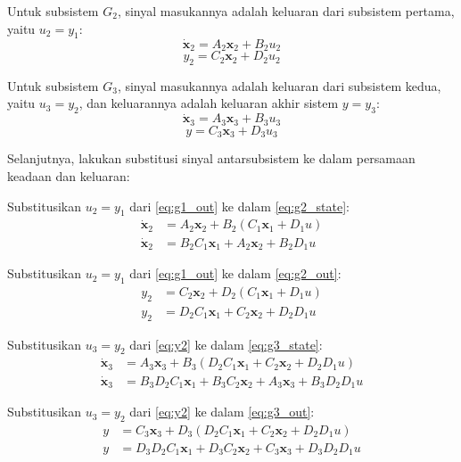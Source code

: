 \documentclass[11pt,a4paper]{article}
\begin{document}
Untuk subsistem $G_2$, sinyal masukannya adalah keluaran dari subsistem pertama, yaitu $u_2 = y_1$:
\begin{equation}
    \label{eq:g2_state}
    \mathbf{\dot{x}}_2 = A_2 \mathbf{x}_2 + B_2 u_2
\end{equation}
\begin{equation}
    \label{eq:g2_out}
    y_2 = C_2 \mathbf{x}_2 + D_2 u_2
\end{equation}

Untuk subsistem $G_3$, sinyal masukannya adalah keluaran dari subsistem kedua, yaitu $u_3 = y_2$, dan keluarannya adalah keluaran akhir sistem $y = y_3$:
\begin{equation}
    \label{eq:g3_state}
    \mathbf{\dot{x}}_3 = A_3 \mathbf{x}_3 + B_3 u_3
\end{equation}
\begin{equation}
    \label{eq:g3_out}
    y = C_3 \mathbf{x}_3 + D_3 u_3
\end{equation}

Selanjutnya, lakukan substitusi sinyal antarsubsistem ke dalam persamaan keadaan dan keluaran:

Substitusikan $u_2 = y_1$ dari \eqref{eq:g1_out} ke dalam \eqref{eq:g2_state}:
\begin{align}
    \label{eq:x2_dot}
    \mathbf{\dot{x}}_2 &= A_2 \mathbf{x}_2 + B_2 (C_1 \mathbf{x}_1 + D_1 u) \nonumber \\
    \mathbf{\dot{x}}_2 &= B_2 C_1 \mathbf{x}_1 + A_2 \mathbf{x}_2 + B_2 D_1 u
\end{align}

Substitusikan $u_2 = y_1$ dari \eqref{eq:g1_out} ke dalam \eqref{eq:g2_out}:
\begin{align}
    \label{eq:y2}
    y_2 &= C_2 \mathbf{x}_2 + D_2 (C_1 \mathbf{x}_1 + D_1 u) \nonumber \\
    y_2 &= D_2 C_1 \mathbf{x}_1 + C_2 \mathbf{x}_2 + D_2 D_1 u
\end{align}

Substitusikan $u_3 = y_2$ dari \eqref{eq:y2} ke dalam \eqref{eq:g3_state}:
\begin{align}
    \label{eq:x3_dot}
    \mathbf{\dot{x}}_3 &= A_3 \mathbf{x}_3 + B_3 (D_2 C_1 \mathbf{x}_1 + C_2 \mathbf{x}_2 + D_2 D_1 u) \nonumber \\
    \mathbf{\dot{x}}_3 &= B_3 D_2 C_1 \mathbf{x}_1 + B_3 C_2 \mathbf{x}_2 + A_3 \mathbf{x}_3 + B_3 D_2 D_1 u
\end{align}

Substitusikan $u_3 = y_2$ dari \eqref{eq:y2} ke dalam \eqref{eq:g3_out}:
\begin{align}
    \label{eq:y_out}
    y &= C_3 \mathbf{x}_3 + D_3 (D_2 C_1 \mathbf{x}_1 + C_2 \mathbf{x}_2 + D_2 D_1 u) \nonumber \\
    y &= D_3 D_2 C_1 \mathbf{x}_1 + D_3 C_2 \mathbf{x}_2 + C_3 \mathbf{x}_3 + D_3 D_2 D_1 u
\end{align}
\end{document}
